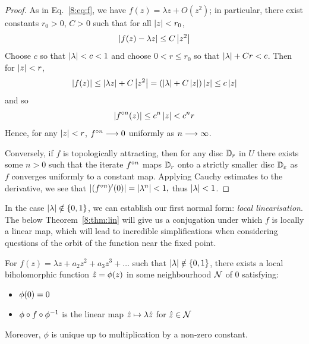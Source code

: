 \documentclass[../main.tex]{subfiles}
\begin{document}
\begin {proof}
    As in Eq.~\ref{8:eq:f}, we have $f(z)=\lambda z+O\left(z^{2}\right)$; in particular, there exist constants $r_0>0$, $C>0$ such that for all $\left|z\right|<r_0$,
    \begin{equation*}
        \left|f(z)-\lambda z\right| \leq C \left|z^{2}\right|
    \end{equation*}
    Choose $c$ so that $\left|\lambda\right|<c<1$ and choose $0<r \leq r_{0}$ so that $\left|\lambda\right|+C r<c$. Then for $\left|z\right|<r$,
    \begin{equation*}
        \left|f(z)\right| \leq\left|\lambda z\right|+C\left|z^{2}\right| = (\left|\lambda\right|+C\left|z\right|)\left|z\right| \leq c\left|z\right|
    \end{equation*}
    and so
    \begin{equation*}
        \left|f^{\circ n}(z)\right| \leq c^{n}\left|z\right|<c^{n} r
    \end{equation*}
    Hence, for any $\left|z\right|<r$, $f^{\circ n}\longrightarrow 0$ uniformly as $n\longrightarrow \infty$. 
    
    Conversely, if $f$ is topologically attracting, then for any disc $\mathbb{D}_r$ in $U$ there exists some $n>0$ such that the iterate $f^{\circ n}$ maps $\mathbb{D}_{r}$ onto a strictly smaller disc $\mathbb{D}_{\varepsilon}$ as $f$ converges uniformly to a constant map. Applying Cauchy estimates to the derivative, we see that $\left|(f^{\circ n})'(0)\right|=\left|\lambda^{n}\right|<1,$ thus $\left|\lambda\right|<1$.
\end{proof}

In the case $\left|\lambda\right| \notin \{0,1\}$, we can establish our first normal form: \emph{local linearisation}. The below Theorem~\ref{8:thm:lin} will give us a conjugation under which $f$ is locally a linear map, which will lead to incredible simplifications when considering questions of the orbit of the function near the fixed point. 

\begin{thm}
    \label{8:thm:lin}
    For $ f(z)=\lambda z+a_{2} z^{2}+a_{3} z^{3}+\dots$ such that $\left|\lambda\right| \notin \{0,1\}$, there exists a local biholomorphic function $\hat{z}=\phi(z)$ in some neighbourhood $\mathcal{N}$ of 0 satisfying:
    \begin{itemize}
        \item $\phi(0)=0$
        \item $\phi\circ f\circ \phi^{-1}$ is the linear map $\hat{z} \mapsto \lambda \hat{z}$ for $\hat{z} \in \mathcal{N}$
    \end{itemize}
    Moreover, $\phi$ is unique up to multiplication by a non-zero constant.
\end{thm}
\end{document}
